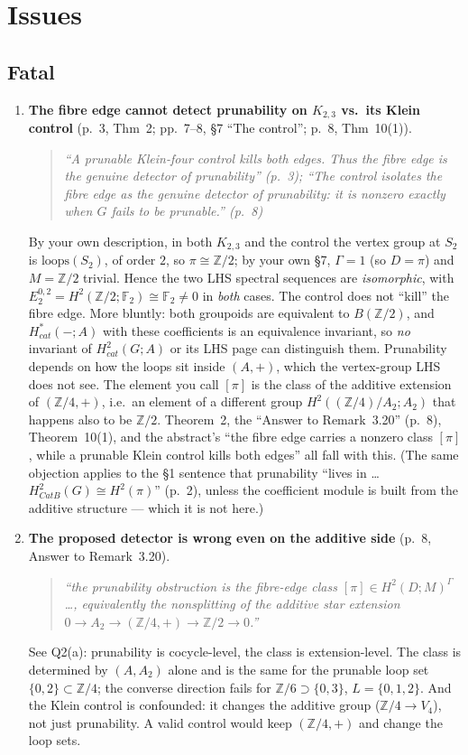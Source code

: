 \documentclass[11pt]{article}
\newcommand{\Z}{\mathbb{Z}}
\newcommand{\F}{\mathbb{F}}
\newenvironment{quoted}{\begin{quote}\small\itshape}{\end{quote}}
\begin{document}
\section*{Issues}

\subsection*{Fatal}
\begin{enumerate}[label=X\arabic*.,leftmargin=*]
\item \textbf{The fibre edge cannot detect prunability on $K_{2,3}$ vs.\ its Klein
control} (p.~3, Thm~2; pp.~7--8, \S7 ``The control''; p.~8, Thm~10(1)).
\begin{quoted}
``A prunable Klein-four control kills both edges. Thus the fibre edge is the genuine
detector of prunability'' (p.~3); ``The control isolates the fibre edge as the
genuine detector of prunability: it is nonzero exactly when $G$ fails to be
prunable.'' (p.~8)
\end{quoted}
By your own description, in both $K_{2,3}$ and the control the vertex group at
$S_2$ is $\mathrm{loops}(S_2)$, of order $2$, so $\pi\cong\Z/2$; by your own \S7,
$\Gamma=1$ (so $D=\pi$) and $M=\Z/2$ trivial. Hence the two LHS spectral sequences
are \emph{isomorphic}, with $E_2^{0,2}=H^2(\Z/2;\F_2)\cong\F_2\ne0$ in \emph{both}
cases. The control does not ``kill'' the fibre edge. More bluntly: both groupoids
are equivalent to $B(\Z/2)$, and $H^*_{cat}(-;A)$ with these coefficients is an
equivalence invariant, so \emph{no} invariant of $H^2_{cat}(G;A)$ or its LHS page
can distinguish them. Prunability depends on how the loops sit inside $(A,+)$,
which the vertex-group LHS does not see. The element you call $[\pi]$ is the class
of the additive extension of $(\Z/4,+)$, i.e.\ an element of a different group
$H^2((\Z/4)/A_2;A_2)$ that happens also to be $\Z/2$. Theorem~2, the ``Answer to
Remark~3.20'' (p.~8), Theorem~10(1), and the abstract's ``the fibre edge carries a
nonzero class $[\pi]$, while a prunable Klein control kills both edges'' all fall
with this. (The same objection applies to the \S1 sentence that prunability
``lives in \ldots\ $H^2_{CatB}(G)\cong H^2(\pi)$'' (p.~2), unless the coefficient
module is built from the additive structure --- which it is not here.)

\item \textbf{The proposed detector is wrong even on the additive side} (p.~8, Answer
to Remark~3.20).
\begin{quoted}
``the prunability obstruction is the fibre-edge class $[\pi]\in H^2(D;M)^\Gamma$
\ldots, equivalently the nonsplitting of the additive star extension
$0\to A_2\to(\Z/4,+)\to\Z/2\to0$.''
\end{quoted}
See Q2(a): prunability is cocycle-level, the class is extension-level. The class
is determined by $(A,A_2)$ alone and is the same for the prunable loop set
$\{0,2\}\subset\Z/4$; the converse direction fails for $\Z/6\supset\{0,3\}$,
$L=\{0,1,2\}$. And the Klein control is confounded: it changes the additive group
($\Z/4\to V_4$), not just prunability. A valid control would keep $(\Z/4,+)$ and
change the loop sets.
\end{enumerate}
\end{document}
